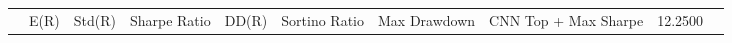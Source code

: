 \begin{tabular}{lrrrrrrrrr}
 & E(R) & Std(R) & Sharpe Ratio & DD(R) & Sortino Ratio & Max Drawdown & %
CNN Top + Max Sharpe & 12.2500%
\end{tabular}
